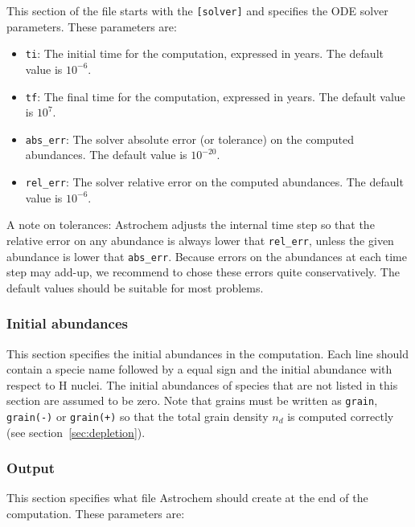 \documentclass[a4paper,12pt]{article}
\begin{document}
This section of the file starts with the \verb=[solver]= and specifies
the ODE solver parameters. These parameters are:

\begin{itemize}

\item \verb=ti=: The initial time for the computation, expressed in
  years. The default value is $10^{-6}$.

\item \verb=tf=: The final time for the computation, expressed in
  years. The default value is $10^{7}$.

\item \verb=abs_err=: The solver absolute error (or tolerance) on the
  computed abundances. The default value is $10^{-20}$.

\item \verb=rel_err=: The solver relative error on the computed
  abundances. The default value is $10^{-6}$.

\end{itemize}

A note on tolerances: Astrochem adjusts the internal time step so that
the relative error on any abundance is always lower that
\verb=rel_err=, unless the given abundance is lower that
\verb=abs_err=. Because errors on the abundances at each time step may
add-up, we recommend to chose these errors quite conservatively. The
default values should be suitable for most problems.

\subsubsection{Initial abundances}
\label{sec:initial-abundances}

This section specifies the initial abundances in the computation. Each
line should contain a specie name followed by a equal sign and the
initial abundance with respect to H nuclei. The initial abundances of
species that are not listed in this section are assumed to be
zero. Note that grains must be written as \verb=grain=,
\verb=grain(-)= or \verb=grain(+)= so that the total grain density
$n_{d}$ is computed correctly (see section~\ref{sec:depletion}).

\subsubsection{Output}
\label{sec:output}

This section specifies what file Astrochem should create at the end of
the computation. These parameters are:
\end{document}
